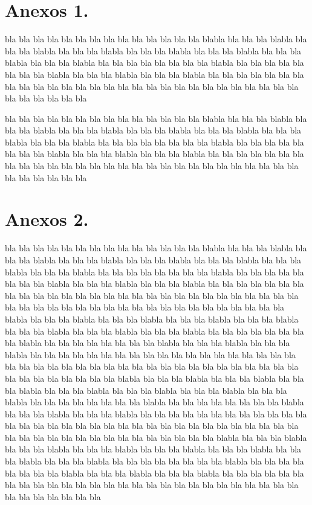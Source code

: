 \documentclass[11pt,letter]{report}
\begin{document}
\appendix  
\clearpage %
\addappheadtotoc 
\appendixpage 

\section{Anexos 1.}


bla bla bla bla bla bla bla bla bla bla bla bla bla bla blabla bla bla bla blabla bla bla bla blabla bla bla bla blabla bla bla bla blabla bla bla bla blabla bla bla bla blabla bla bla bla blabla bla bla bla bla bla bla bla bla blabla bla bla bla bla bla bla bla bla blabla bla bla bla blabla bla bla bla blabla bla bla bla bla bla bla bla bla bla bla bla bla bla bla bla bla bla bla bla bla bla bla bla bla bla bla bla bla bla bla bla bla bla bla 

bla bla bla bla bla bla bla bla bla bla bla bla bla bla blabla bla bla bla blabla bla bla bla blabla bla bla bla blabla bla bla bla blabla bla bla bla blabla bla bla bla blabla bla bla bla blabla bla bla bla bla bla bla bla bla blabla bla bla bla bla bla bla bla bla blabla bla bla bla blabla bla bla bla blabla bla bla bla bla bla bla bla bla bla bla bla bla bla bla bla bla bla bla bla bla bla bla bla bla bla bla bla bla bla bla bla bla bla bla 

\section{Anexos 2.}


bla bla bla bla bla bla bla bla bla bla bla bla bla bla blabla bla bla bla blabla bla bla bla blabla bla bla bla blabla bla bla bla blabla bla bla bla blabla bla bla bla blabla bla bla bla blabla bla bla bla bla bla bla bla bla blabla bla bla bla bla bla bla bla bla blabla bla bla bla blabla bla bla bla blabla bla bla bla bla bla bla bla bla bla bla bla bla bla bla bla bla bla bla bla bla bla bla bla bla bla bla bla bla bla bla bla bla bla bla
bla bla bla bla bla bla bla bla bla bla bla bla bla bla blabla bla bla bla blabla bla bla bla blabla bla bla bla blabla bla bla bla blabla bla bla bla blabla bla bla bla blabla bla bla bla blabla bla bla bla bla bla bla bla bla blabla bla bla bla bla bla bla bla bla blabla bla bla bla blabla bla bla bla blabla bla bla bla bla bla bla bla bla bla bla bla bla bla bla bla bla bla bla bla bla bla bla bla bla bla bla bla bla bla bla bla bla bla bla
bla bla bla bla bla bla bla bla bla bla bla bla bla bla blabla bla bla bla blabla bla bla bla blabla bla bla bla blabla bla bla bla blabla bla bla bla blabla bla bla bla blabla bla bla bla blabla bla bla bla bla bla bla bla bla blabla bla bla bla bla bla bla bla bla blabla bla bla bla blabla bla bla bla blabla bla bla bla bla bla bla bla bla bla bla bla bla bla bla bla bla bla bla bla bla bla bla bla bla bla bla bla bla bla bla bla bla bla bla
bla bla bla bla bla bla bla bla bla bla bla bla bla bla blabla bla bla bla blabla bla bla bla blabla bla bla bla blabla bla bla bla blabla bla bla bla blabla bla bla bla blabla bla bla bla blabla bla bla bla bla bla bla bla bla blabla bla bla bla bla bla bla bla bla blabla bla bla bla blabla bla bla bla blabla bla bla bla bla bla bla bla bla bla bla bla bla bla bla bla bla bla bla bla bla bla bla bla bla bla bla bla bla bla bla bla bla bla bla
\end{document}
